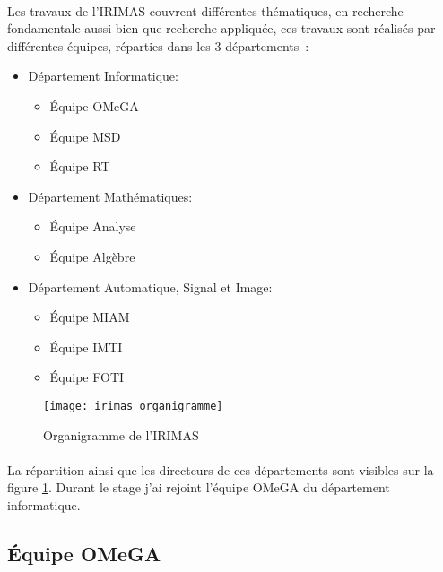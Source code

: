 \documentclass[a4paper,11pt,twoside,french,report]{../common/simplem}
\begin{document}
				\paragraph*{}
					Les travaux de l'\gls{IRIMAS} couvrent différentes thématiques, en recherche fondamentale aussi bien que recherche appliquée, ces travaux sont réalisés par différentes équipes, réparties dans les 3 départements~\cite{UHA_IRIMAS}:
					\begin{itemize}
						\item Département Informatique:
							\begin{itemize}
								\item Équipe \gls{OMeGA}
								\item Équipe \gls{MSD}
								\item Équipe \gls{RT}
							\end{itemize}
						\item Département Mathématiques:
							\begin{itemize}
								\item Équipe Analyse
								\item Équipe Algèbre
							\end{itemize}
						\item Département Automatique, Signal et Image:
							\begin{itemize}
								\item Équipe \gls{MIAM}
								\item Équipe \gls{IMTI}
								\item Équipe \gls{FOTI}
							\end{itemize}
					\end{itemize}
					\begin{figure}[H]
						\centering%
						\texttt{[image: irimas\_organigramme]}%
						\caption{Organigramme de l'\acrshort{IRIMAS}~\cite{IRIMAS_Organigramme}}%
						\label{fig:irimas_organigramme}%
					\end{figure}
				\paragraph*{}
					La répartition ainsi que les directeurs de ces départements sont visibles sur la figure \ref{fig:irimas_organigramme}. Durant le stage j'ai rejoint l'équipe \gls{OMeGA} du département informatique.
			\subsection{Équipe \acrshort{OMeGA}}
\end{document}
